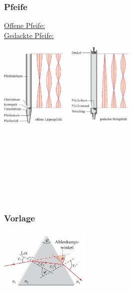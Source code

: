 \subsubsection{Pfeife}

\begin{center}
	\begin{minipage}{0.25\textwidth}
		\underline{Offene Pfeife:}
		\\\underline{Gedackte Pfeife:}
	\end{minipage}%
	\begin{minipage}{0.25\textwidth}
		\includegraphics[height=4cm,right,keepaspectratio=true]{Images/eigenschwingung_pfeife.png}
	\end{minipage}
\end{center}
\\
\\
\\
\\
\\
\\
\\










\subsubsection{Vorlage}

\begin{center}
	\begin{minipage}{0.3\textwidth}
		
	\end{minipage}%
	\begin{minipage}{0.3\textwidth}
		\includegraphics[height=3cm,keepaspectratio=true]{Images/prisma.png}
	\end{minipage}
\end{center}
